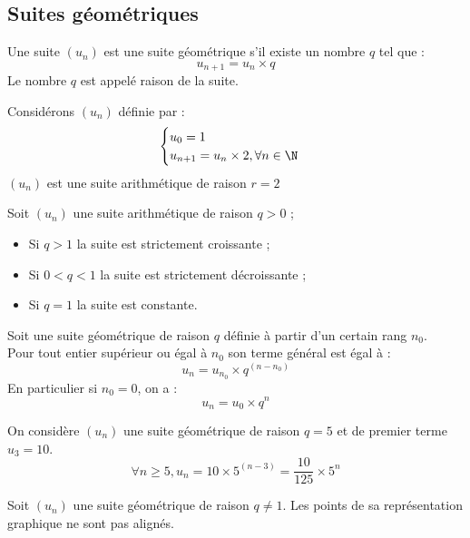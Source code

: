 \documentclass[11pt]{article}
\begin{document}
\subsection{Suites géométriques}

\begin{definition}
Une suite $(u_n)$ est une suite géométrique s'il existe un nombre $q$
tel que :
\[ u_{n+1} = u_n \times q \]
Le nombre $q$ est appelé raison de la suite.
\end{definition}

\begin{exemple}
Considérons $(u_n)$ définie par :
\[ \begin{cases}
u_0 = 1 \\
u_{n+1} = u_n \times 2, \forall n
\in \N
\end{cases} \]
$(u_n)$ est une suite arithmétique de raison $r=2$
\end{exemple}

\begin{propriete}
Soit $(u_n)$ une suite arithmétique de raison $q>0$ ;
\begin{itemize}
\item Si $q > 1$ la suite est strictement croissante ;
\item Si $0 < q < 1$ la suite est strictement décroissante ;
\item Si $q = 1$ la suite est constante.
\end{itemize}
\end{propriete}


\begin{theoreme}
Soit une suite géométrique de raison $q$ définie à partir d'un
certain rang $n_0$.\\
Pour tout entier supérieur ou égal à $n_0$ son terme général est égal à :
\[ u_n = u_{n_0} \times q^{(n-n_0)}\]
En particulier si $n_0=0$, on a : 
\[ u_n = u_0 \times q^n\]
\end{theoreme}

\begin{exemple}
On considère $(u_n)$ une suite géométrique de raison $q=5$ et de
premier terme $u_3=10$.
\[ \forall n \ge 5, u_n=10 \times 5^{(n-3)} = \dfrac{10}{125} \times 5^n\]
\end{exemple}

\begin{propriete}
Soit $(u_n)$ une suite géométrique de raison $q \neq 1$. Les points de
sa représentation graphique ne sont pas alignés.
\end{propriete}
\end{document}
